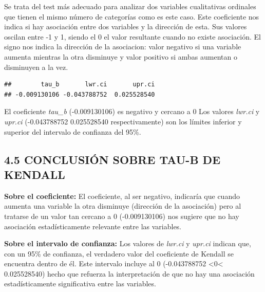 \documentclass[
  12 pt,
  a4paper,
]{article}
\newenvironment{Shaded}{\begin{snugshade}}{\end{snugshade}}
\newcommand{\AttributeTok}[1]{\textcolor[rgb]{0.13,0.29,0.53}{#1}}
\newcommand{\FloatTok}[1]{\textcolor[rgb]{0.00,0.00,0.81}{#1}}
\newcommand{\FunctionTok}[1]{\textcolor[rgb]{0.13,0.29,0.53}{\textbf{#1}}}
\newcommand{\NormalTok}[1]{#1}
\newcommand{\OtherTok}[1]{\textcolor[rgb]{0.56,0.35,0.01}{#1}}
\newcommand{\SpecialCharTok}[1]{\textcolor[rgb]{0.81,0.36,0.00}{\textbf{#1}}}
\begin{document}
Se trata del test más adecuado para analizar dos variables cualitativas
ordinales que tienen el mismo número de categorías como es este caso.
Este coeficiente nos indica si hay asociación entre dos variables y la
dirección de esta. Sus valores oscilan entre -1 y 1, siendo el 0 el
valor resultante cuando no existe asociación. El signo nos indica la
dirección de la asociacion: valor negativo si una variable aumenta
mientras la otra disminuye y valor positivo si ambas aumentan o
disminuyen a la vez.

\begin{Shaded}
\end{Shaded}

\begin{verbatim}
##        tau_b       lwr.ci       upr.ci 
## -0.009130106 -0.043788752  0.025528540
\end{verbatim}

El coeficiente \emph{tau\_b} (-0.009130106) es negativo y cercano a 0
Los valores \emph{lwr.ci} y \emph{upr.ci} (-0.043788752 0.025528540
respectivamente) son los límites inferior y superior del intervalo de
confianza del 95\%.

\subsection{4.5 CONCLUSIÓN SOBRE TAU-B DE
KENDALL}\label{conclusiuxf3n-sobre-tau-b-de-kendall}

\textbf{Sobre el coeficiente:} El coeficiente, al ser negativo,
indicaría que cuando aumenta una variable la otra disminuye (dirección
de la asociación) pero al tratarse de un valor tan cercano a 0
(-0.009130106) nos sugiere que no hay asociación estadísticamente
relevante entre las variables.

\textbf{Sobre el intervalo de confianza:} Los valores de \emph{lwr.ci} y
\emph{upr.ci} indican que, con un 95\% de confianza, el verdadero valor
del coeficiente de Kendall se encuentra dentro de él. Este intervalo
incluye al 0 (-0.043788752 \textless0\textless{} 0.025528540) hecho que
refuerza la interpretación de que no hay una asociación estadísticamente
significativa entre las variables.
\end{document}
